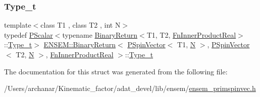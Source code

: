 \subsubsection{\texorpdfstring{Type\_t}{Type\_t}\hspace{0.1cm}{\footnotesize\ttfamily [2/2]}}
{\footnotesize\ttfamily template$<$class T1 , class T2 , int N$>$ \\
typedef \mbox{\hyperlink{classENSEM_1_1PScalar}{P\+Scalar}}$<$typename \mbox{\hyperlink{structENSEM_1_1BinaryReturn}{Binary\+Return}}$<$T1, T2, \mbox{\hyperlink{structENSEM_1_1FnInnerProductReal}{Fn\+Inner\+Product\+Real}}$>$\+::\mbox{\hyperlink{structENSEM_1_1BinaryReturn_3_01PSpinVector_3_01T1_00_01N_01_4_00_01PSpinVector_3_01T2_00_01N_01_4_00_01FnInnerProductReal_01_4_aa5f2db16692ec046a61e1b2b044a2790}{Type\+\_\+t}}$>$ \mbox{\hyperlink{structENSEM_1_1BinaryReturn}{E\+N\+S\+E\+M\+::\+Binary\+Return}}$<$ \mbox{\hyperlink{classENSEM_1_1PSpinVector}{P\+Spin\+Vector}}$<$ T1, \mbox{\hyperlink{operator__name__util_8cc_a7722c8ecbb62d99aee7ce68b1752f337}{N}} $>$, \mbox{\hyperlink{classENSEM_1_1PSpinVector}{P\+Spin\+Vector}}$<$ T2, \mbox{\hyperlink{operator__name__util_8cc_a7722c8ecbb62d99aee7ce68b1752f337}{N}} $>$, \mbox{\hyperlink{structENSEM_1_1FnInnerProductReal}{Fn\+Inner\+Product\+Real}} $>$\+::\mbox{\hyperlink{structENSEM_1_1BinaryReturn_3_01PSpinVector_3_01T1_00_01N_01_4_00_01PSpinVector_3_01T2_00_01N_01_4_00_01FnInnerProductReal_01_4_aa5f2db16692ec046a61e1b2b044a2790}{Type\+\_\+t}}}



The documentation for this struct was generated from the following file\+:\begin{DoxyCompactItemize}
\item 
/\+Users/archanar/\+Kinematic\+\_\+factor/adat\+\_\+devel/lib/ensem/\mbox{\hyperlink{lib_2ensem_2ensem__primspinvec_8h}{ensem\+\_\+primspinvec.\+h}}\end{DoxyCompactItemize}
